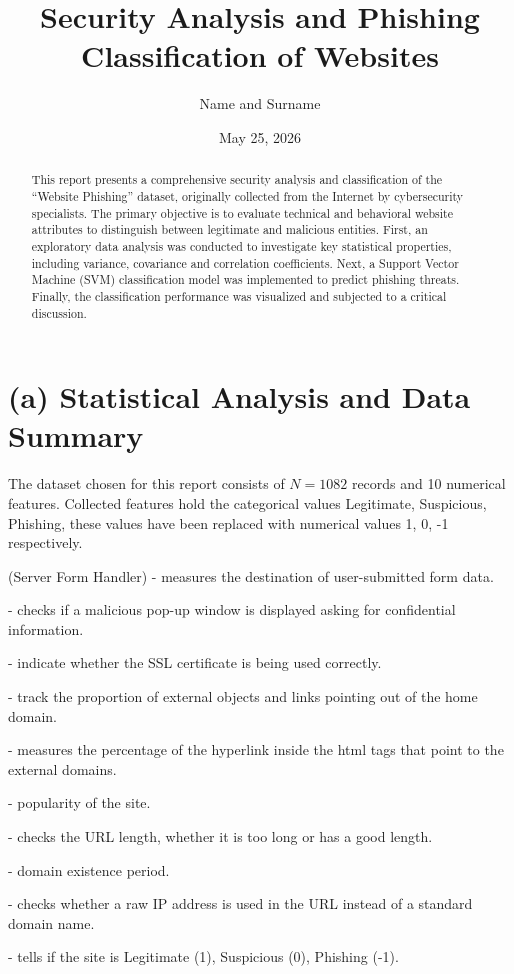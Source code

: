 \documentclass[11pt,a4paper]{article}
\title{\vspace{-0.5cm}\textbf{Security Analysis and Phishing Classification of Websites}}
\author{Name and Surname}
\date{May 25, 2026}
\begin{document}
\maketitle 

\begin{abstract}
\noindent This report presents a comprehensive security analysis and classification of the ``Website Phishing'' dataset, originally collected from the Internet by cybersecurity specialists. The primary objective is to evaluate technical and behavioral website attributes to distinguish between legitimate and malicious entities. First, an exploratory data analysis was conducted to investigate key statistical properties, including variance, covariance and correlation coefficients. Next, a Support Vector Machine (SVM) classification model was implemented to predict phishing threats. Finally, the classification performance was visualized and subjected to a critical discussion.
\end{abstract}

\section{(a) Statistical Analysis and Data Summary}
The dataset chosen for this report consists of $N = 1082$ records and 10 numerical features. Collected features hold the categorical values Legitimate, Suspicious, Phishing, these values have been replaced with numerical values 1, 0, -1 respectively.

\begin{description}[itemsep=1pt, topsep=2pt, parsep=1pt]
    \item[SFH] (Server Form Handler) - measures the destination of user-submitted form data.
    \item[popUpWindow] - checks if a malicious pop-up window is displayed asking for confidential information.
    \item[SSLfinal\_State] - indicate whether the SSL certificate is being used correctly.
    \item[Request\_URL] - track the proportion of external objects and links pointing out of the home domain.
    \item[URL\_of\_Anchor] - measures the percentage of the hyperlink inside the html tags that point to the external domains.
    \item[web\_traffic] - popularity of the site.
    \item[URL\_Length] - checks the URL length, whether it is too long or has a good length.
    \item[age\_of\_domain] - domain existence period.
    \item[having\_IP\_Address] - checks whether a raw IP address is used in the URL instead of a standard domain name.
    \item[Result] - tells if the site is Legitimate (1), Suspicious (0), Phishing (-1).
\end{description}
\end{document}
